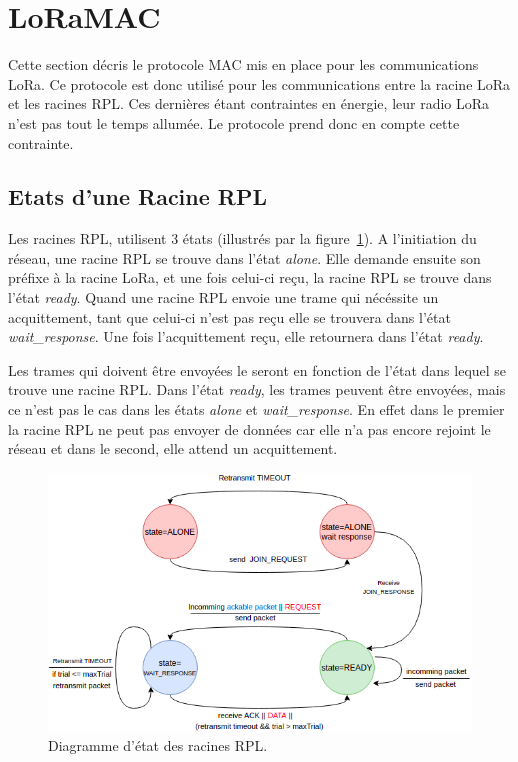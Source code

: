 \section{LoRaMAC}\label{sec:archi-loramac:proto}
\renewcommand{\rightmark}{LoRaMac}

    Cette section décris le protocole MAC mis en place pour les communications LoRa. Ce protocole est donc utilisé pour les communications entre la racine LoRa et les racines RPL. Ces dernières étant contraintes en énergie, leur radio LoRa n'est pas tout le temps allumée. Le protocole prend donc en compte cette contrainte.

\subsection{Etats d'une Racine RPL}
    Les racines RPL, utilisent 3 états (illustrés par la figure~\ref{fig:archi-state}). A l'initiation du réseau, une racine RPL se trouve dans l'état \textit{alone}. Elle demande ensuite son préfixe à la racine LoRa, et une fois celui-ci reçu, la racine RPL se trouve dans l'état \textit{ready}. Quand une racine RPL envoie une trame qui nécéssite un acquittement, tant que celui-ci n'est pas reçu elle se trouvera dans l'état \textit{wait\_response}. Une fois l'acquittement reçu, elle retournera dans l'état \textit{ready}.
    
    Les trames qui doivent être envoyées le seront en fonction de l'état dans lequel se trouve une racine RPL. Dans l'état \textit{ready}, les trames peuvent être envoyées, mais ce n'est pas le cas dans les états \textit{alone} et \textit{wait\_response}. En effet dans le premier la racine RPL ne peut pas envoyer de données car elle n'a pas encore rejoint le réseau et dans le second, elle attend un acquittement.
    \begin{figure}[H]
        \centering
        \includegraphics[scale=0.5]{res/pictures/loramac-state.drawio.png}
        \caption{Diagramme d'état des racines RPL.}
        \label{fig:archi-state}
    \end{figure}

